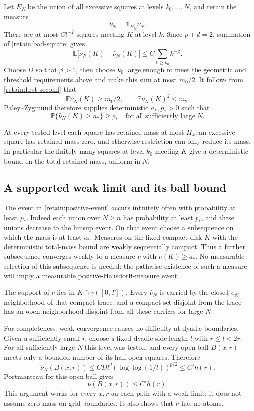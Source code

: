 Let $E_N$ be the union of all excessive squares at levels
$k_0,\ldots,N$, and retain the measure
\[
 \widehat\nu_N=\mathbf1_{E_N^c}\nu_N.
\]
There are at most $Cl^{-2}$ squares meeting $K$ at level $k$.
Since $p+d=2$, summation of \eqref{retain:bad-square} gives
\[
 \mathbb E\bigl[\nu_N(K)-\widehat\nu_N(K)\bigr]
 \le C\sum_{k\ge k_0}k^{-\beta}.
\]
Choose $D$ so that $\beta>1$, then choose $k_0$ large enough to meet
the geometric and threshold requirements above and make this sum at most $m_0/2$.
It follows from \eqref{retain:first-second} that
\[
 \mathbb E\widehat\nu_N(K)\ge m_0/2,
 \qquad\mathbb E\widehat\nu_N(K)^2\le m_2.
\]
Paley--Zygmund therefore supplies deterministic $a_*,p_*>0$ such
that
\begin{equation}
 \mathbb P\{\widehat\nu_N(K)\ge a_*\}\ge p_*
 \quad\text{for all sufficiently large }N.
 \label{retain:positive-event}
\end{equation}

At every tested level each square has retained mass at most $H_k$:
an excessive square has retained mass zero, and otherwise restriction
can only reduce its mass.  In particular the finitely many squares
at level $k_0$ meeting $K$ give a deterministic bound on the total
retained mass, uniform in $N$.

\subsection{A supported weak limit and its ball bound}

The event in \eqref{retain:positive-event} occurs infinitely often
with probability at least $p_*$.  Indeed each union over $N\ge n$
has probability at least $p_*$, and these unions decrease to the
limsup event.  On that event choose a subsequence on which the mass
is at least $a_*$.  Measures on the fixed compact disk $K$ with the
deterministic total-mass bound are weakly sequentially compact.
Thus a further subsequence converges weakly to a measure $\nu$ with
$\nu(K)\ge a_*$.  No measurable selection of this subsequence is
needed: the pathwise existence of such a measure will imply a
measurable positive-Hausdorff-measure event.

The support of $\nu$ lies in $K\cap\gamma([0,T])$.  Every
$\widehat\nu_N$ is carried by the closed $e_N$-neighborhood of that
compact trace, and a compact set disjoint from the trace has an open
neighborhood disjoint from all these carriers for large $N$.

For completeness, weak convergence causes no difficulty at dyadic
boundaries.  Given a sufficiently small $r$, choose a fixed dyadic
side length $l$ with $r\le l<2r$.  For all sufficiently large $N$
this level was tested, and every open ball $B(x,r)$ meets only a
bounded number of its half-open squares.  Therefore
\[
 \widehat\nu_N(B(x,r))\le C D l^d(\log\log(1/l))^{p/2}
 \le C' h(r).
\]
Portmanteau for this open ball gives
\begin{equation}
 \nu(B(x,r))\le C'h(r).
 \label{retain:ball}
\end{equation}
This argument works for every $x,r$ on each path with a weak limit;
it does not assume zero mass on grid boundaries.  It also shows that
$\nu$ has no atoms.

